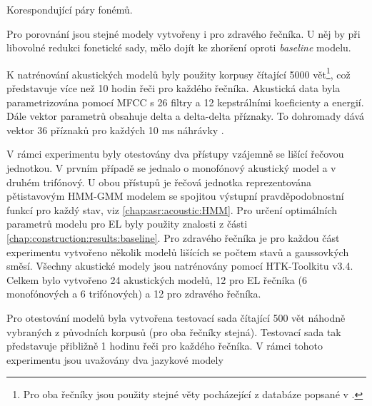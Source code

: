 \begin{table}[htpb]
  \centering
  \def\arraystretch{1.5}
  \caption{Korespondující páry fonémů.}
  \label{tab:construction:reduction:pairs}
\end{table}

\noindent Pro porovnání jsou stejné modely vytvořeny i pro zdravého řečníka. U něj by při libovolné redukci fonetické sady, mělo dojít ke zhoršení oproti \textit{baseline} modelu.

K natrénování akustických modelů byly použity korpusy čítající 5000 vět\footnote{Pro oba řečníky jsou použity stejné věty pocházející z databáze popsané v \cite{Radova2000}.}, což představuje více než 10 hodin řeči pro každého řečníka. Akustická data byla parametrizována pomocí MFCC s 26 filtry a 12 kepstrálními koeficienty a energií. Dále vektor parametrů obsahuje delta a delta-delta příznaky. To dohromady dává vektor 36 příznaků pro každých 10 ms náhrávky \cite{Psutka2007}.

V rámci experimentu byly otestovány dva přístupy vzájemně se lišící řečovou jednotkou. V prvním případě se jednalo o monofónový akustický model a v druhém trifónový. U obou přístupů je řečová jednotka reprezentována pětistavovým HMM-GMM modelem se spojitou výstupní pravděpodobnostní funkcí pro každý stav, viz \ref{chap:asr:acoustic:HMM}. Pro určení optimálních parametrů modelu pro EL byly použity znalosti z části \ref{chap:construction:results:baseline}. Pro zdravého řečníka je pro každou část experimentu vytvořeno několik modelů lišících se počtem stavů a gaussovkých směsí. Všechny akustické modely jsou natrénovány pomocí HTK-Toolkitu v3.4. Celkem bylo vytvořeno 24 akustických modelů, 12 pro EL řečníka (6 monofónových a 6 trifónových) a 12 pro zdravého řečníka.

Pro otestování modelů byla vytvořena testovací sada čítající 500 vět náhodně vybraných z původních korpusů (pro oba řečníky stejná). Testovací sada tak představuje přibližně 1 hodinu řeči pro každého řečníka. V rámci tohoto experimentu jsou uvažovány dva jazykové modely

